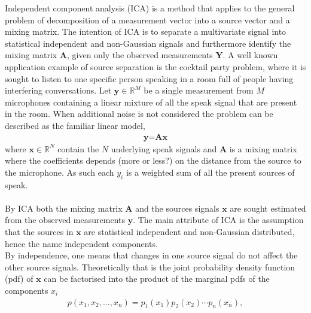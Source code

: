 Independent component analysis (ICA) is a method that applies to  the general problem of decomposition of a measurement vector into a source vector and a mixing matrix. The intention of ICA is to separate a multivariate signal into statistical independent and non-Gaussian signals and furthermore identify the mixing matrix $\textbf{A}$, given only the observed measurements $\textbf{Y}$.
A well known application example of source separation is the cocktail party problem, where it is sought to listen to one specific person speaking in a room full of people having interfering conversations. 
Let $\textbf{y}\in \mathbb{R}^{M}$ be a single measurement from $M$ microphones containing a linear mixture of all the speak signal that are present in the room. When additional noise is not considered the problem can be described as the familiar linear model, 
\begin{align}
\textbf{y}=\textbf{Ax}\label{eq:ICA1}
\end{align}
where $\textbf{x}\in \mathbb{R}^{N}$ contain the $N$ underlying speak signals and $\textbf{A}$ is a mixing matrix where the coefficients depends (more or less?) on the distance from the source to the microphone. As such each $y_i$ is a weighted sum of all the present sources of speak.
\\ \\
By ICA both the mixing matrix $\textbf{A}$ and the sources signals $\textbf{x}$ are sought estimated from the observed measurements $\textbf{y}$. The main attribute of ICA is the assumption that the sources in $\textbf{x}$ are statistical independent and non-Gaussian distributed, hence the name independent components.\\     
By independence, one means that changes in one source signal do not affect the other source signals. Theoretically that is the joint probability density function (pdf) of $\textbf{x}$ can be factorised into the product of the marginal pdfs of the components $x_i$
\begin{align*}
p(x_1, x_2, \dots, x_n) = p_1 (x_1) p_2(x_2) \cdots p_n(x_n),
\end{align*}


